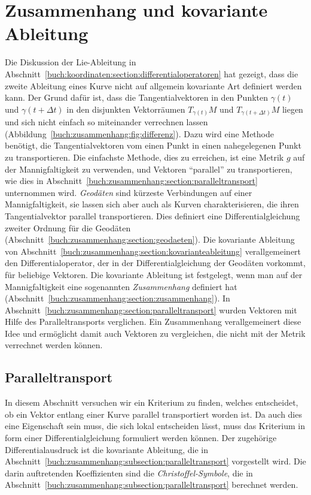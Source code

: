 %
%
%
\chapter{Zusammenhang und kovariante Ableitung
\label{chapter:zusammenhang}}

\noindent
Die Diskussion der Lie-Ableitung in
Abschnitt~\ref{buch:koordinaten:section:differentialoperatoren}
hat gezeigt, dass die zweite Ableitung eines Kurve nicht auf
allgemein kovariante Art definiert werden kann.
Der Grund dafür ist, dass die Tangentialvektoren in den Punkten
$\gamma(t)$ und $\gamma(t+\Delta t)$ in den disjunkten Vektorräumen
$T_{\gamma(t)}M$ und $T_{\gamma(t+\Delta t)}M$ liegen und sich nicht
einfach so miteinander verrechnen lassen
(Abbildung~\ref{buch:zusammenhang:fig:differenz}).
%
Dazu wird eine Methode benötigt, die Tangentialvektoren vom einen
Punkt in einen nahegelegenen Punkt zu transportieren.
Die einfachste Methode, dies zu erreichen, ist eine Metrik $g$ auf der
Mannigfaltigkeit zu verwenden, und Vektoren ``parallel'' zu transportieren,
wie dies in Abschnitt~\ref{buch:zusammenhang:section:paralleltransport}
unternommen wird.
{\em Geodäten} sind kürzeste Verbindungen auf einer Mannigfaltigkeit, sie
lassen sich aber auch als Kurven charakterisieren, die ihren Tangentialvektor
parallel transportieren.
%
Dies definiert eine Differentialgleichung zweiter Ordnung für die
Geodäten (Abschnitt~\ref{buch:zusammenhang:section:geodaeten}).
Die kovariante Ableitung von
Abschnitt~\ref{buch:zusammenhang:section:kovarianteableitung}
verallgemeinert den Differentialoperator, der in der Differentialgleichung
der Geodäten vorkommt, für beliebige Vektoren.
Die kovariante Ableitung ist festgelegt, wenn man auf der Mannigfaltigkeit
eine sogenannten {\em Zusammenhang} definiert hat
(Abschnitt~\ref{buch:zusammenhang:section:zusammenhang}). 
%
In Abschnitt~\ref{buch:zusammenhang:section:paralleltransport} wurden
Vektoren mit Hilfe des Paralleltransports verglichen.
Ein Zusammenhang verallgemeinert diese Idee und ermöglicht damit auch
Vektoren zu vergleichen, die nicht mit der Metrik verrechnet werden
können.

%
%
\section{Paralleltransport
\label{buch:zusammenhang:section:paralleltransport}}
In diesem Abschnitt versuchen wir ein Kriterium zu finden, welches
entscheidet, ob ein Vektor entlang einer Kurve parallel transportiert
worden ist.
Da auch dies eine Eigenschaft sein muss, die sich lokal entscheiden
lässt, muss das Kriterium in form einer Differentialgleichung
formuliert werden können.
Der zugehörige Differentialausdruck ist die kovariante Ableitung,
die in Abschnitt~\ref{buch:zusammenhang:subsection:paralleltransport}
vorgestellt wird.
Die darin auftretenden Koeffizienten sind die {\em Christoffel-Symbole},
die in Abschnitt~\ref{buch:zusammenhang:subsection:paralleltransport}
berechnet werden.


